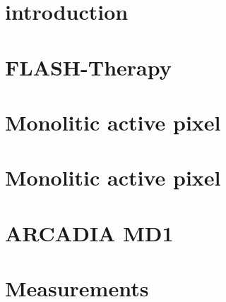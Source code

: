 
\label{chip}
\begin{titlepage}

\section{introduction}

\section{FLASH-Therapy}

\section{Monolitic active pixel}

\section{Monolitic active pixel}


\section{ARCADIA MD1}

\section{Measurements}



\end{titlepage}
